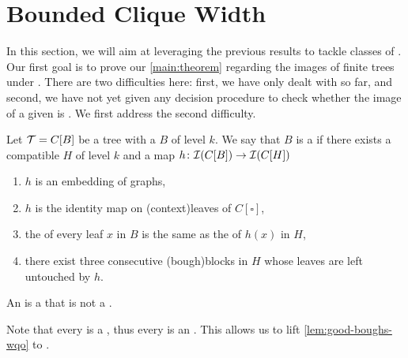 
\section{Bounded Clique Width}
\label{sec:hereditary-classes}


In this section, we will aim at leveraging the previous results to tackle
classes of . Our first goal is to prove our
\cref{main:theorem} regarding the images of finite trees under
. There are two difficulties here: first, we have only
dealt with  so far, and second, we have not
yet given any decision procedure to check whether the image of a given
 is . We first
address the second difficulty.

\begin{definition}
  \label{def:perfect-bough}
  Let $\aTree = C[B]$ be a tree with a  $B$ of level $k$.
  We say that $B$ is a  if there exists a compatible
   $H$ of level $k$ and 
  a map $h \colon \mathcal{I}(C[B]) \to \mathcal{I}(C[H])$
  \begin{enumerate}
      \item $h$ is an embedding of graphs,
      \item $h$ is the identity map on \kl(context){leaves} of $C[\square]$,
      \item the  of every leaf $x$ in $B$ is the same as 
        the  of $h(x)$ in $H$,
      \item there exist three consecutive
            \kl(bough){blocks} in $H$ whose leaves
            	are left untouched by $h$.
  \end{enumerate}
  An  is a  that is not a .
\end{definition}

Note that every  is a , thus every  is an . This allows us to lift
\cref{lem:good-boughs-wqo} to .


